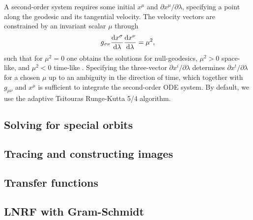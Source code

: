 A second-order system requires some initial $x^\mu$ and $\partial x^\mu / \partial \lambda$, specifying a point along the geodesic and its tangential velocity. The velocity vectors are constrained by an invariant scalar $\mu$ through
\begin{equation}
    g_{\sigma\nu} \frac{\text{d} x^\sigma}{\text{d} \lambda} \frac{\text{d} x^\nu}{\text{d} \lambda} = \mu^2,
\end{equation}
such that for $\mu^2 = 0$ one obtains the solutions for null-geodesics, $\mu^2 > 0$ space-like, and $\mu^2 < 0$ time-like . Specifying the three-vector $\partial x^i / \partial \lambda$ determines $\partial x^t / \partial \lambda$ for a chosen $\mu$ up to an ambiguity in the direction of time, which together with $g_{\mu\nu}$ and $x^\mu$ is sufficient to integrate the second-order ODE system. By default, we use the adaptive Tsitouras Runge-Kutta 5/4 algorithm.
\\[1em]


\subsection{Solving for special orbits}

\subsection{Tracing and constructing images}





\subsection{Transfer functions}



\subsection{LNRF with Gram-Schmidt}


